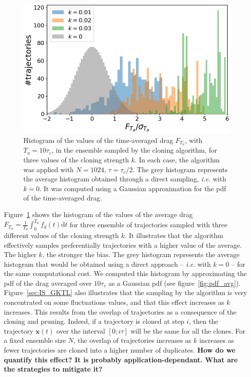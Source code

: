 \documentclass{jfm}
\begin{document}
\begin{figure}
  \centering
  \includegraphics[width=.7\linewidth]{IS_GKTL/IS_GKTL_2}
  \caption{Histogram of the values of the time-averaged drag $F_{T_a}$, with $T_a = 10\tau_c$, in the ensemble sampled by the cloning algorithm, for three values of the cloning strength $k$. In each case, the algorithm was applied with $N=1024$, $\tau = \tau_c / 2$. The grey histogram represents the average histogram obtained through a direct sampling, \textit{i.e.} with $k=0$. It was computed using a Gaussian approximation for the \ac{pdf} of the time-averaged drag.}
  \label{fig:IS_GKTL}
\end{figure}
Figure~\ref{fig:IS_GKTL} shows the histogram of the values of the average drag $F_{T_a} = \frac{1}{T_a}\int_{0}^{T_a}f_d(t)\mathrm{d}t$ for three ensemble of trajectories sampled with three different values of the cloning strength $k$.
It illustrates that the algorithm effectively samples preferentially trajectories with a higher value of the average.
The higher $k$, the stronger the bias.
The grey histogram represents the average histogram that would be obtained using a direct approach -- \textit{i.e.} with $k=0$ -- for the same computational cost.
We computed this histogram by approximating the \ac{pdf} of the drag averaged over $10\tau_c$ as a Gaussian \ac{pdf} (see figure~\ref{fig:pdf_avg}).
Figure~\ref{sec:IS_GKTL} also illustrates that the sampling by the algorithm is very concentrated on some fluctuations values, and that this effect increases as $k$ increases.
This results from the overlap of trajectories as a consequence of the cloning and pruning.
Indeed, if a trajectory is cloned at step $i$, then the trajectory ${\mathbf{x}(t)}$ over the interval $[0;i\tau]$ will be the same for all the clones.
For a fixed ensemble size $N$, the overlap of trajectories increases as $k$ increases as fewer
trajectories are cloned into a higher number of duplicates.
\textbf{How do we quantify this effect? It is probably application-dependant. What are the strategies to mitigate it?}
\end{document}

